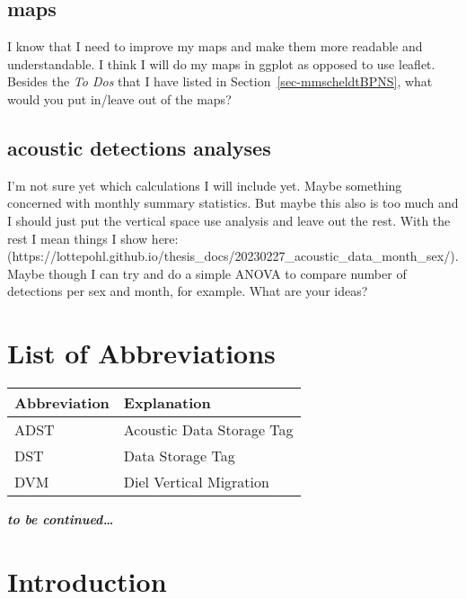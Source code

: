 \documentclass[
  authoryear,
  review,
  3p]{elsarticle}
\begin{document}
\hypertarget{sec-questionsmaps}{%
\subsection{maps}\label{sec-questionsmaps}}

I know that I need to improve my maps and make them more readable and
understandable. I think I will do my maps in ggplot as opposed to use
leaflet. Besides the \emph{To Dos} that I have listed in
Section~\ref{sec-mmscheldtBPNS}, what would you put in/leave out of the
maps?

\hypertarget{sec-questionacousticanalyses}{%
\subsection{acoustic detections
analyses}\label{sec-questionacousticanalyses}}

I'm not sure yet which calculations I will include yet. Maybe something
concerned with monthly summary statistics. But maybe this also is too
much and I should just put the vertical space use analysis and leave out
the rest. With the rest I mean things I show here:
(https://lottepohl.github.io/thesis\_docs/20230227\_acoustic\_data\_month\_sex/).
Maybe though I can try and do a simple ANOVA to compare number of
detections per sex and month, for example. What are your ideas?

\newpage{}

\hypertarget{list-of-abbreviations}{%
\section*{List of Abbreviations}\label{list-of-abbreviations}}

\begin{table}[!h]
\centering
\begin{tabular}{l|l}
\hline
Abbreviation & Explanation\\
\hline
ADST & Acoustic Data Storage Tag\\
\hline
DST & Data Storage Tag\\
\hline
DVM & Diel Vertical Migration\\
\hline
\end{tabular}
\end{table}

\textbf{\emph{to be continued\ldots{}}}

\newpage{}

\hypertarget{sec-intro}{%
\section{Introduction}\label{sec-intro}}
\end{document}
